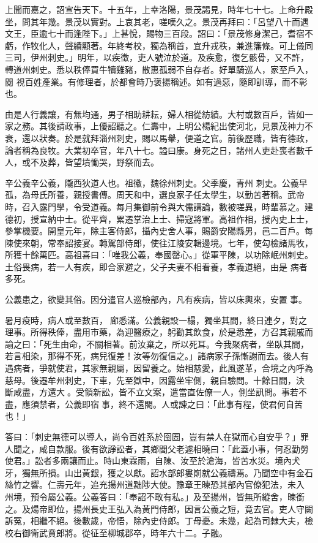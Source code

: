 \begin{pinyinscope}
 上聞而嘉之，詔宣告天下。十五年，上幸洛陽，景茂謁見，時年七十七。上命升殿坐，問其年幾。景茂以實對。上哀其老，嗟嘆久之。景茂再拜曰：「呂望八十而遇文王，臣逾七十而逢陛下。」上甚悅，賜物三百段。詔曰：「景茂修身潔己，耆宿不虧，作牧化人，聲績顯著。年終考校，獨為稱首，宜升戎秩，兼進籓條。可上儀同三司，伊州刺史。」明年，以疾徵，吏人號泣於道。及疾愈，復乞骸骨，又不許，轉道州刺史。悉以秩俸買牛犢雞豬，散惠孤弱不自存者。好單騎巡人，家至戶入，閱
 視百姓產業。有修理者，於都會時乃褒揚稱述。如有過惡，隨即訓導，而不彰也。



 由是人行義讓，有無均通，男子相助耕耘，婦人相從紡績。大村或數百戶，皆如一家之務。其後請政事，上優詔聽之。仁壽中，上明公楊紀出使河北，見景茂神力不衰，還以狀奏。於是就拜淄州刺史，賜以馬轝，便道之官。前後歷職，皆有德政，論者稱為良牧。大業初卒官，年八十七。謚曰康。身死之日，諸州人吏赴喪者數千人，或不及葬，皆望墳慟哭，野祭而去。



 辛公義辛公義，隴西狄道人也。祖徽，魏徐州刺史。父季慶，青州
 刺史。公義早孤，為母氏所養，親授書傳。周天和中，選良家子任太學生，以勤苦著稱。武帝時，召入露門學，令受道義。每月集御前令與大儒講論，數被嗟異，時輩慕之。建德初，授宣納中士。從平齊，累遷掌治上士、掃寇將軍。高祖作相，授內史上士，參掌機要。開皇元年，除主客侍郎，攝內史舍人事，賜爵安陽縣男，邑二百戶。每陳使來朝，常奉詔接宴。轉駕部侍郎，使往江陵安輯邊境。七年，使勾檢諸馬牧，所獲十餘萬匹。高祖喜曰：「唯我公義，奉國罄心。」從軍平陳，以功除岷州刺史。土俗畏病，若一人有疾，即合家避之，父子夫妻不相看養，孝義道絕，由是
 病者多死。



 公義患之，欲變其俗。因分遣官人巡檢部內，凡有疾病，皆以床輿來，安置事。



 暑月疫時，病人或至數百，廊悉滿。公義親設一榻，獨坐其間，終日連夕，對之理事。所得秩俸，盡用市藥，為迎醫療之，躬勸其飲食，於是悉差，方召其親戚而諭之曰：「死生由命，不關相著。前汝棄之，所以死耳。今我聚病者，坐臥其間，若言相染，那得不死，病兒復差！汝等勿復信之。」諸病家子孫慚謝而去。後人有遇病者，爭就使君，其家無親屬，因留養之。始相慈愛，此風遂革，合境之內呼為慈母。後遷牟州刺史，下車，先至獄中，因露坐牢側，親自驗問。十餘日間，決
 斷咸盡，方還大。受領新訟，皆不立文案，遣當直佐僚一人，側坐訊問。事若不盡，應須禁者，公義即宿事，終不還閤。人或諫之曰：「此事有程，使君何自苦也！」



 答曰：「刺史無德可以導人，尚令百姓系於囹圄，豈有禁人在獄而心自安乎？」罪人聞之，咸自款服。後有欲諍訟者，其鄉閭父老遽相曉曰：「此蓋小事，何忍勤勞使君。」訟者多兩讓而止。時山東霖雨，自陳、汝至於滄海，皆苦水災。境內犬牙，獨無所損。山出黃銀，獲之以獻。詔水部郎婁崱就公義禱焉。乃聞空中有金石絲竹之響。仁壽元年，追充揚州道黜陟大使。豫章王暕恐其部內官僚犯法，未入
 州境，預令屬公義。公義答曰：「奉詔不敢有私。」及至揚州，皆無所縱舍，暕銜之。及煬帝即位，揚州長史王弘入為黃門侍郎，因言公義之短，竟去官。吏人守闕訴冤，相繼不絕。後數歲，帝悟，除內史侍郎。丁母憂。未幾，起為司隸大夫，檢校右御衛武賁郎將。從征至柳城郡卒，時年六十二。子融。




\end{pinyinscope}
